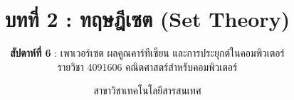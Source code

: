 
\renewcommand{\footchaptertitle}{บทที่ 2 ทฤษฎีเซต (สัปดาห์ที่ 6)}

\title{\textbf{บทที่ 2 : ทฤษฎีเซต (Set Theory)}}
\subtitle{\textbf{สัปดาห์ที่ 6} : เพาเวอร์เซต ผลคูณคาร์ทีเซียน และการประยุกต์ในคอมพิวเตอร์ \\ รายวิชา 4091606 คณิตศาสตร์สำหรับคอมพิวเตอร์}
\author{สาขาวิชาเทคโนโลยีสารสนเทศ}
\date{}




